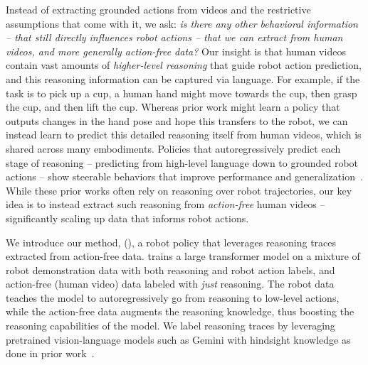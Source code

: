 Instead of extracting grounded actions from videos and the restrictive assumptions that come with it, we ask: 
\emph{is there any other behavioral information -- that still directly influences robot actions -- that we can extract from human videos, and more generally action-free data?}
Our insight is that human videos contain vast amounts of \emph{higher-level reasoning} that guide robot action prediction, and this reasoning information can be captured via language. For example, if the task is to pick up a cup, a human hand might move towards the cup, then grasp the cup, and then lift the cup. 
Whereas prior work might learn a policy that outputs changes in the hand pose and hope this transfers to the robot, we can instead learn to predict this detailed reasoning itself from human videos, which is shared across many embodiments.
Policies that autoregressively predict each stage of reasoning -- predicting from high-level language down to grounded robot actions -- show steerable behaviors that improve performance and generalization~\cite{zawalski2024robotic, belkhale2024rt}. While these prior works often rely on reasoning over robot trajectories, our key idea is to instead extract such reasoning from \emph{action-free} human videos -- significantly scaling up data that informs robot actions.

We introduce our method, \Method (\ACRO), a robot policy that leverages reasoning traces extracted from action-free data. \ACRO trains a large transformer model on a mixture of robot demonstration data with both reasoning and robot action labels, and action-free (human video) data labeled with \emph{just} reasoning. The robot data teaches the model to autoregressively go from reasoning to low-level actions, while the action-free data augments the reasoning knowledge, thus boosting the reasoning capabilities of the model. We label reasoning traces by leveraging pretrained vision-language models such as Gemini with hindsight knowledge as done in prior work~\cite{zawalski2024robotic}. 

